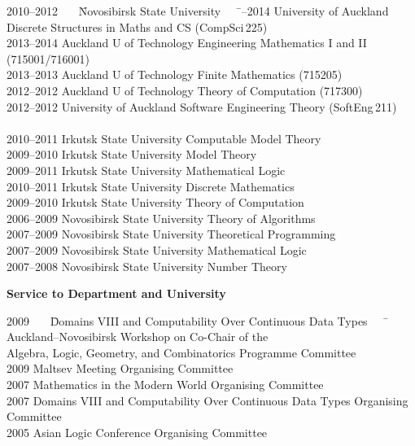 \documentclass[12pt]{article}
\begin{document}
\begin{tabbing}
2010--2012 \ \ \ \= Novosibirsk State University \ \ \ \= --2014        \> University of Auckland             \> Discrete Structures in Maths and CS (CompSci\,225)\\
2013--2014       \> Auckland U of Technology       \> Engineering Mathematics I and II (715001/716001)\\
2013--2013       \> Auckland U of Technology       \> Finite Mathematics (715205)\\
2012--2012       \> Auckland U of Technology        \> Theory of Computation (717300)\\
2012--2012       \> University of Auckland              \> Software Engineering Theory (SoftEng\,211)\\
\\
2010--2011       \> Irkutsk State University              \> Computable Model Theory\\
2009--2010       \> Irkutsk State University              \> Model Theory\\
2009--2011       \> Irkutsk State University              \> Mathematical Logic\\
2010--2011       \> Irkutsk State University              \> Discrete Mathematics\\
2009--2010       \> Irkutsk State University              \> Theory of Computation\\
2006--2009       \> Novosibirsk State University       \> Theory of Algorithms\\
2007--2009       \> Novosibirsk State University       \> Theoretical Programming\\
2007--2009       \> Novosibirsk State University       \> Mathematical Logic\\
2007--2008       \> Novosibirsk State University       \> Number Theory\\
\end{tabbing}

\centerline{\bf Service to Department and University}
\begin{tabbing}
2009 \ \ \ \= Domains VIII and Computability Over Continuous Data Types \ \ \ \=           \> Auckland--Novosibirsk Workshop on       \> Co-Chair of the \\
              \> Algebra, Logic, Geometry, and Combinatorics      \> Programme Committee \\
2009          \> Maltsev Meeting                          \> Organising Committee\\
2007          \> Mathematics in the Modern World          \> Organising Committee\\
2007          \> Domains VIII and Computability Over Continuous Data Types     \> Organising Committee\\
2005          \> Asian Logic Conference                   \> Organising Committee\\
\end{tabbing}
\end{document}
